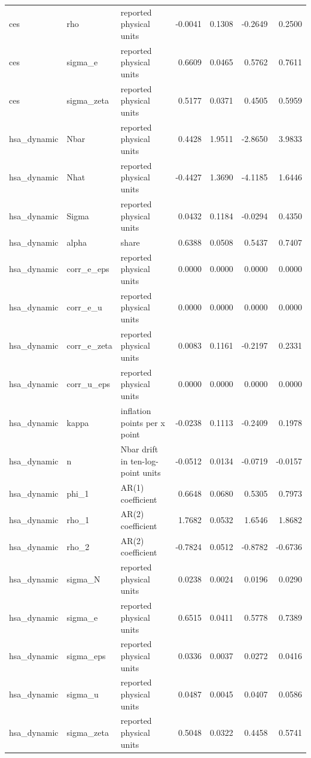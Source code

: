 \begin{tabular}{lllrrrr}
ces & rho & reported physical units & -0.0041 & 0.1308 & -0.2649 & 0.2500 \\
ces & sigma\_e & reported physical units & 0.6609 & 0.0465 & 0.5762 & 0.7611 \\
ces & sigma\_zeta & reported physical units & 0.5177 & 0.0371 & 0.4505 & 0.5959 \\
hsa\_dynamic & Nbar & reported physical units & 0.4428 & 1.9511 & -2.8650 & 3.9833 \\
hsa\_dynamic & Nhat & reported physical units & -0.4427 & 1.3690 & -4.1185 & 1.6446 \\
hsa\_dynamic & Sigma & reported physical units & 0.0432 & 0.1184 & -0.0294 & 0.4350 \\
hsa\_dynamic & alpha & share & 0.6388 & 0.0508 & 0.5437 & 0.7407 \\
hsa\_dynamic & corr\_e\_eps & reported physical units & 0.0000 & 0.0000 & 0.0000 & 0.0000 \\
hsa\_dynamic & corr\_e\_u & reported physical units & 0.0000 & 0.0000 & 0.0000 & 0.0000 \\
hsa\_dynamic & corr\_e\_zeta & reported physical units & 0.0083 & 0.1161 & -0.2197 & 0.2331 \\
hsa\_dynamic & corr\_u\_eps & reported physical units & 0.0000 & 0.0000 & 0.0000 & 0.0000 \\
hsa\_dynamic & kappa & inflation points per x point & -0.0238 & 0.1113 & -0.2409 & 0.1978 \\
hsa\_dynamic & n & Nbar drift in ten-log-point units & -0.0512 & 0.0134 & -0.0719 & -0.0157 \\
hsa\_dynamic & phi\_1 & AR(1) coefficient & 0.6648 & 0.0680 & 0.5305 & 0.7973 \\
hsa\_dynamic & rho\_1 & AR(2) coefficient & 1.7682 & 0.0532 & 1.6546 & 1.8682 \\
hsa\_dynamic & rho\_2 & AR(2) coefficient & -0.7824 & 0.0512 & -0.8782 & -0.6736 \\
hsa\_dynamic & sigma\_N & reported physical units & 0.0238 & 0.0024 & 0.0196 & 0.0290 \\
hsa\_dynamic & sigma\_e & reported physical units & 0.6515 & 0.0411 & 0.5778 & 0.7389 \\
hsa\_dynamic & sigma\_eps & reported physical units & 0.0336 & 0.0037 & 0.0272 & 0.0416 \\
hsa\_dynamic & sigma\_u & reported physical units & 0.0487 & 0.0045 & 0.0407 & 0.0586 \\
hsa\_dynamic & sigma\_zeta & reported physical units & 0.5048 & 0.0322 & 0.4458 & 0.5741 \\

\end{tabular}
